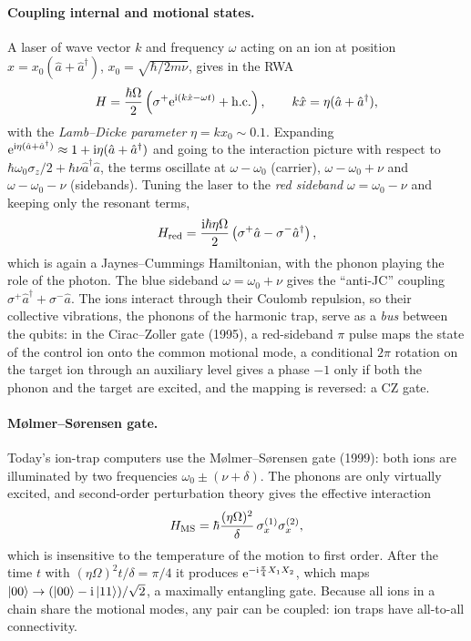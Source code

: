\paragraph{Coupling internal and motional states.} A laser of wave vector $k$ and frequency $\omega$ acting on an ion at position $\hat x=x_0(\hat a+\hat a^\dagger)$, $x_0=\sqrt{\hbar/2m\nu}$, gives in the RWA
\begin{equation}
  H=\frac{\hbar\Omega}2\left(\sigma^+\mathrm e^{\mathrm i(k\hat x-\omega t)}+\text{h.c.}\right),\qquad k\hat x=\eta(\hat a+\hat a^\dagger),
\end{equation}
with the \emph{Lamb--Dicke parameter} $\eta=kx_0\sim0.1$. Expanding $\mathrm e^{\mathrm i\eta(\hat a+\hat a^\dagger)}\approx1+\mathrm i\eta(\hat a+\hat a^\dagger)$ and going to the interaction picture with respect to $\hbar\omega_0\sigma_z/2+\hbar\nu\hat a^\dagger\hat a$, the terms
oscillate at $\omega-\omega_0$ (carrier), $\omega-\omega_0+\nu$ and $\omega-\omega_0-\nu$ (sidebands). Tuning the laser to the \emph{red sideband} $\omega=\omega_0-\nu$ and keeping only the resonant terms,
\begin{equation}
  H_{\rm red}=\frac{\mathrm i\hbar\eta\Omega}2\left(\sigma^+\hat a-\sigma^-\hat a^\dagger\right),
\end{equation}
which is again a Jaynes--Cummings Hamiltonian, with the phonon playing the role of the photon. The blue sideband $\omega=\omega_0+\nu$ gives the ``anti-JC'' coupling $\sigma^+\hat a^\dagger+\sigma^-\hat a$. The ions interact through their Coulomb
repulsion, so their collective vibrations, the phonons of the harmonic trap, serve as a \emph{bus} between the qubits: in the Cirac--Zoller gate \cite{CiracZoller1995} (1995), a red-sideband $\pi$ pulse maps the state of the control ion onto the
common motional mode, a conditional $2\pi$ rotation on the target ion through an auxiliary level gives a phase $-1$ only if both the phonon and the target are excited, and the mapping is reversed: a CZ gate.

\paragraph{Mølmer--Sørensen gate.} Today's ion-trap computers use the Mølmer--Sørensen gate (1999): both ions are illuminated by two frequencies $\omega_0\pm(\nu+\delta)$. The phonons are only virtually excited, and second-order perturbation theory gives the
effective interaction
\begin{equation}
  H_{\rm MS}=\hbar\frac{(\eta\Omega)^2}{\delta}\,\sigma_x^{(1)}\sigma_x^{(2)},
\end{equation}
which is insensitive to the temperature of the motion to first order. After the time $t$ with $(\eta\Omega)^2t/\delta=\pi/4$ it produces $\mathrm e^{-\mathrm i\frac\pi4X_1X_2}$, which maps $\left|00\right\rangle\to(\left|00\right\rangle-\mathrm i\left|11\right\rangle)/\sqrt2$, a maximally entangling gate.
Because all ions in a chain share the motional modes, any pair can be coupled: ion traps have all-to-all connectivity.

